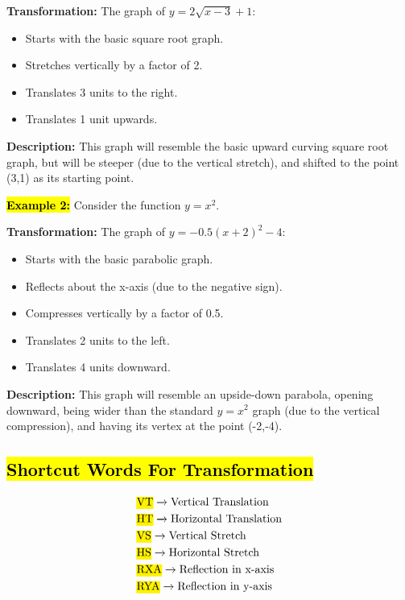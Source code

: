 \documentclass[12pt,a4paper]{article}
\begin{document}
\textbf{Transformation:} The graph of \(y = 2\sqrt{x-3} + 1\):

\begin{itemize}
    \item Starts with the basic square root graph.
    \item Stretches vertically by a factor of 2.
    \item Translates 3 units to the right.
    \item Translates 1 unit upwards.
\end{itemize}

\textbf{Description:} This graph will resemble the basic upward curving square root graph, but will be steeper (due to the vertical stretch), and shifted to the point (3,1) as its starting point.

\textbf{\hl{Example 2:}} Consider the function \(y = x^2\).

\textbf{Transformation:} The graph of \(y = -0.5(x+2)^2 - 4\):

\begin{itemize}
    \item Starts with the basic parabolic graph.
    \item Reflects about the x-axis (due to the negative sign).
    \item Compresses vertically by a factor of 0.5.
    \item Translates 2 units to the left.
    \item Translates 4 units downward.
\end{itemize}

\textbf{Description:} This graph will resemble an upside-down parabola, opening downward, being wider than the standard \(y = x^2\) graph (due to the vertical compression), and having its vertex at the point (-2,-4).

\subsection*{\hl{Shortcut Words For Transformation}}
\begin{align*}
    & \text{\hl{VT}} \xrightarrow{} \text{Vertical Translation} \\
    & \text{\hl{HT}} \xrightarrow{} \text{Horizontal Translation} \\
    & \text{\hl{VS}} \xrightarrow{} \text{Vertical Stretch} \\
    & \text{\hl{HS}} \xrightarrow{} \text{Horizontal Stretch} \\
    & \text{\hl{RXA}} \xrightarrow{} \text{Reflection in x-axis} \\
    & \text{\hl{RYA}} \xrightarrow{} \text{Reflection in y-axis} \\
\end{align*}
\end{document}
